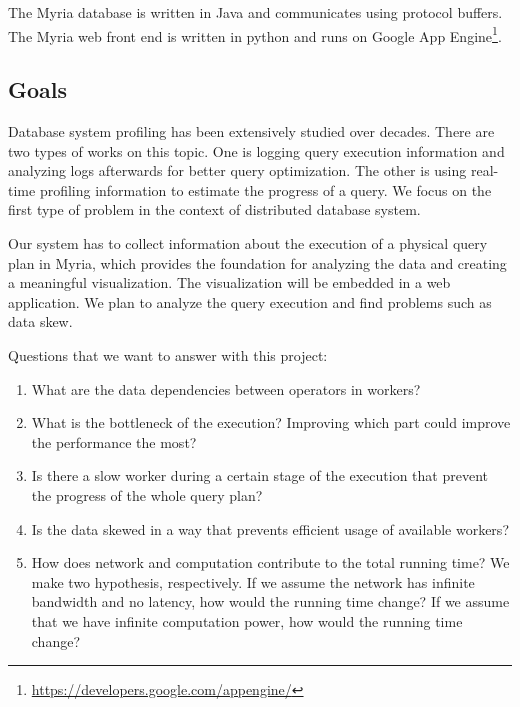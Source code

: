 \documentclass[11pt]{scrartcl}
\begin{document}
The Myria database is written in Java and communicates using protocol buffers. The Myria web front end is written in python and runs on Google App Engine\footnote{\url{https://developers.google.com/appengine/}}.


\subsection{Goals}
\label{sec:objective}

Database system profiling has been extensively studied over decades. There are two types of works on this topic. One is logging query execution information and analyzing logs afterwards for better query optimization. The other is using real-time profiling information to estimate the progress of a query. We focus on the first type of problem in the context of distributed database system.

Our system has to collect information about the execution of a physical query plan in Myria, which provides the foundation for analyzing the data and creating a meaningful visualization. The visualization will be embedded in a web application. We plan to analyze the query execution and find problems such as data skew.

\vspace{5px}

\noindent Questions that we want to answer with this project:

\begin{enumerate}
  \item What are the data dependencies between operators in workers?
  \item What is the bottleneck of the execution? Improving which part could improve the performance the most?
  \item Is there a slow worker during a certain stage of the execution that prevent the progress of the whole query plan?
  \item Is the data skewed in a way that prevents efficient usage of available workers?
  \item How does network and computation contribute to the total running time? We make two hypothesis, respectively. If we assume the network has infinite bandwidth and no latency, how would the running time change? If we assume that we have infinite computation power, how would the running time change?

\end{enumerate}
\end{document}
